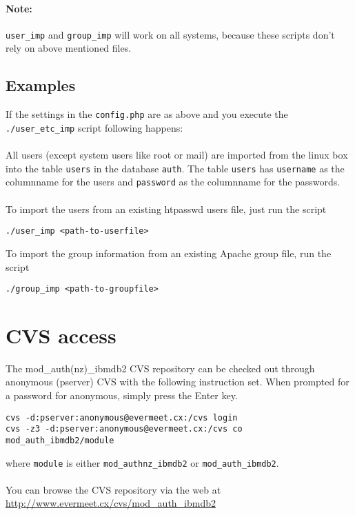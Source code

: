 \documentclass[11pt,a4paper]{article}
\begin{document}
\paragraph{Note:}{{\tt user\_imp} and {\tt group\_imp} will work on all systems, because these scripts don't rely on above mentioned files.}
\subsection{Examples}
If the settings in the {\tt config.php} are as above and you execute the {\tt ./user\_etc\_imp} script following happens:\\
\\
All users (except system users like root or mail) are imported from the linux box into the table {\tt users} in the database {\tt auth}.
The table {\tt users} has {\tt username} as the columnname for the users and {\tt password} as the columnname for the passwords.\\
\\
To import the users from an existing htpasswd users file, just run the script
\begin{verbatim}
./user_imp <path-to-userfile>
\end{verbatim}
To import the group information from an existing Apache group file, run the script
\begin{verbatim}
./group_imp <path-to-groupfile>
\end{verbatim}
\newpage

\section{CVS access}
The mod\_auth(nz)\_ibmdb2 CVS repository can be checked out through anonymous (pserver) CVS with the following instruction set. When prompted for a password for anonymous, simply press the Enter key.
\begin{verbatim}
cvs -d:pserver:anonymous@evermeet.cx:/cvs login
cvs -z3 -d:pserver:anonymous@evermeet.cx:/cvs co mod_auth_ibmdb2/module
\end{verbatim}
where {\tt module} is either {\tt mod\_authnz\_ibmdb2} or {\tt mod\_auth\_ibmdb2}.\\
\\
You can browse the CVS repository via the web at\\
\url{http://www.evermeet.cx/cvs/mod_auth_ibmdb2}
\newpage
\end{document}
